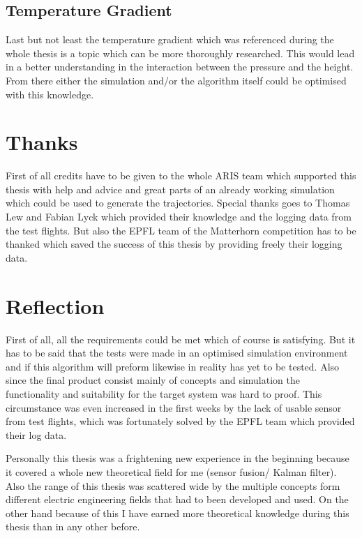 \subsection{Temperature Gradient}
Last but not least the temperature gradient which was referenced during the whole thesis is a topic which can be more thoroughly researched.
This would lead in a better understanding in the interaction between the pressure and the height.
From there either the simulation and/or the algorithm itself could be optimised with this knowledge.

\section{Thanks}
First of all credits have to be given to the whole ARIS team which supported this thesis with help and advice and great parts of an already working simulation which could be used to generate the trajectories.
Special thanks goes to Thomas Lew and Fabian Lyck which provided their knowledge and the logging data from the test flights.
But also the EPFL team of the Matterhorn competition has to be thanked which saved the success of this thesis by providing freely their logging data.

\section{Reflection}
First of all, all the requirements could be met which of course is satisfying. 
But it has to be said that the tests were made in an optimised simulation environment and if this algorithm will preform likewise in reality has yet to be tested.
Also since the final product consist mainly of concepts and simulation the functionality and suitability for the target system was hard to proof.
This circumstance was even increased in the first weeks by the lack of usable sensor from test flights,
which was fortunately solved by the EPFL team which provided their log data.

Personally this thesis was a frightening new experience in the beginning because it covered a whole new theoretical field for me (sensor fusion/ Kalman filter).
Also the range of this thesis was scattered wide by the multiple concepts form different electric engineering fields that had to been developed and used.
On the other hand because of this I have earned more theoretical knowledge during this thesis than in any other before.
